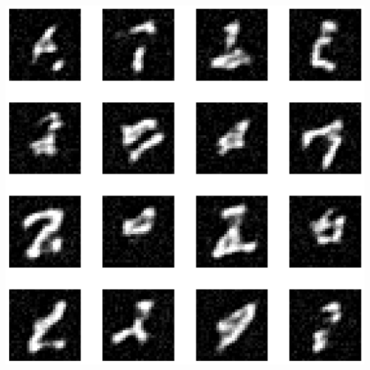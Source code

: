 \documentclass[a4paper, 11pt]{article}
\begin{document}
\begin{center}
\includegraphics[width=.9\linewidth]{./.ob-jupyter/0f3f0e54e530983abb7d269c4c35266ac2b88c7c.png}
\end{center}
\end{document}
